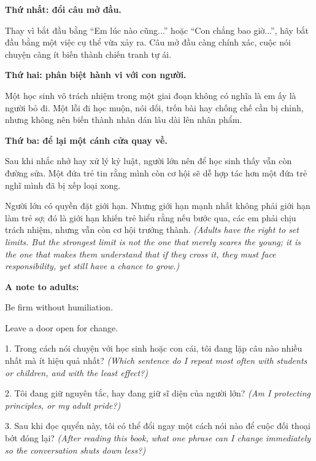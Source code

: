 \begin{goigiaovien}
\textbf{Thứ nhất: đổi câu mở đầu.}

Thay vì bắt đầu bằng ``Em lúc nào cũng...'' hoặc ``Con chẳng bao giờ...'', hãy bắt đầu bằng một việc cụ thể vừa xảy ra. Câu mở đầu càng chính xác, cuộc nói chuyện càng ít biến thành chiến tranh tự ái.

\textbf{Thứ hai: phân biệt hành vi với con người.}

Một học sinh vô trách nhiệm trong một giai đoạn không có nghĩa là em ấy là người bỏ đi. Một lỗi đi học muộn, nói dối, trốn bài hay chống chế cần bị chỉnh, nhưng không nên biến thành nhãn dán lâu dài lên nhân phẩm.

\textbf{Thứ ba: để lại một cánh cửa quay về.}

Sau khi nhắc nhở hay xử lý kỷ luật, người lớn nên để học sinh thấy vẫn còn đường sửa. Một đứa trẻ tin rằng mình còn cơ hội sẽ dễ hợp tác hơn một đứa trẻ nghĩ mình đã bị xếp loại xong.
\end{goigiaovien}

\begin{baihoc}
Người lớn có quyền đặt giới hạn. Nhưng giới hạn mạnh nhất không phải giới hạn làm trẻ sợ; đó là giới hạn khiến trẻ hiểu rằng nếu bước qua, các em phải chịu trách nhiệm, nhưng vẫn còn cơ hội trưởng thành.
\textit{(Adults have the right to set limits. But the strongest limit is not the one that merely scares the young; it is the one that makes them understand that if they cross it, they must face responsibility, yet still have a chance to grow.)}
\end{baihoc}

\begin{ghinhoanh}
\textbf{A note to adults:}

Be firm without humiliation.

Leave a door open for change.
\end{ghinhoanh}

\begin{tuhocnhanh}
1. Trong cách nói chuyện với học sinh hoặc con cái, tôi đang lặp câu nào nhiều nhất mà ít hiệu quả nhất? \textit{(Which sentence do I repeat most often with students or children, and with the least effect?)}

2. Tôi đang giữ nguyên tắc, hay đang giữ sĩ diện của người lớn? \textit{(Am I protecting principles, or my adult pride?)}

3. Sau khi đọc quyển này, tôi có thể đổi ngay một cách nói nào để cuộc đối thoại bớt đóng lại? \textit{(After reading this book, what one phrase can I change immediately so the conversation shuts down less?)}
\end{tuhocnhanh}

\ngancach